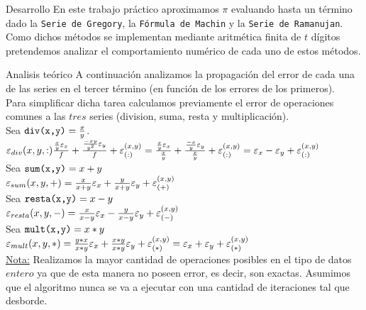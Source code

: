 \begin{section}{Desarrollo}
	En este trabajo práctico aproximamos $\pi$ evaluando hasta un término dado la \texttt{Serie de Gregory}, la \texttt{Fórmula de Machin} y la \texttt{Serie de Ramanujan}.
	Como dichos métodos se implementan mediante aritmética finita de $t$ dígitos pretendemos analizar el comportamiento numérico de cada uno de estos métodos.
	 
	\begin{subsection}{Analisis teórico}
		A continuación analizamos la propagación del error de cada una de las series en el tercer término (en función de los errores de los primeros).\\
		
		Para simplificar dicha tarea calculamos previamente el error de operaciones comunes a las $tres$ series (division, suma, resta y multiplicación).\\
		
		Sea $\texttt{div(x,y)}=\frac{x}{y}$.\\
		
		$\varepsilon _{div}({x,y,:}){\frac{\frac{x}{y}\varepsilon _{x}}{f} + \frac{\frac{-xy}{y^2}\varepsilon _{y}}{f} + \varepsilon _{({:})}^{({x,y})}} = 
		\frac{\frac{x}{y}\varepsilon _{x}}{\frac{x}{y}} + \frac{\frac{-x}{y}\varepsilon _{y}}{\frac{x}{y}} + \varepsilon _{({:})}^{({x,y})} = \varepsilon _{x} - \varepsilon _{y} + \varepsilon _{({:})}^{({x,y})}$\\
		
		Sea $\texttt{sum(x,y)}=x+y$\\
	
		$\varepsilon _{sum}({x,y,+}) = \frac{x}{x+y}\varepsilon _{x} + \frac{y}{x+y}\varepsilon _{y} + \varepsilon _{({+})}^{({x,y})}$\\
		
		Sea $\texttt{resta(x,y)}=x-y$\\
	
		$\varepsilon _{resta}({x,y,-}) = \frac{x}{x-y}\varepsilon _{x} - \frac{y}{x-y}\varepsilon _{y} + \varepsilon _{({-})}^{({x,y})}$\\
		
		Sea $\texttt{mult(x,y)}=x*y$\\
	
		$\varepsilon _{mult}({x,y,*}) = \frac{y*x}{x*y}\varepsilon _{x} + \frac{x*y}{x*y}\varepsilon _{y} + \varepsilon _{({*})}^{({x,y})} = \varepsilon _{x} + \varepsilon _{y} + \varepsilon _{({*})}^{({x,y})}$\\
	
		\underline{Nota:} Realizamos la mayor cantidad de operaciones posibles en el tipo de datos $entero$ ya que de esta manera no poseen error, es decir, son exactas.
		Asumimos que el algoritmo nunca se va a ejecutar con una cantidad de iteraciones tal que desborde.\\
		

\end{subsection}
\end{section}
